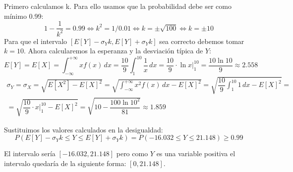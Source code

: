 Primero calculamos k. Para ello usamos que la probabilidad debe ser como mínimo 0.99:
\begin{equation*}
    1-\dfrac{1}{k^2} = 0.99 \iff k^2 = 1/0.01 \iff k = \pm \sqrt{100} \iff k = \pm 10
\end{equation*}
Para que el intervalo $[E[Y] - \sigma_Y k, E[Y] + \sigma_Y k]$ sea correcto debemos tomar $k=10$. Ahora calcularemos la esperanza y la desviación típica de $Y$:
\begin{equation*}
    E[Y] = E[X] = \int_{-\infty}^{+\infty} xf(x) \,dx  = \dfrac{10}{9} \int_{1}^{10} \dfrac{1}{x} \,dx = \dfrac{10}{9} \cdot \ln x \Big|_1^{10} = \dfrac{10 \ln{10}}{9} \approx 2.558
\end{equation*}
\begin{gather*}
    \sigma_Y = \sigma_X = \sqrt{E[X^2]-E[X]^2} = \sqrt{\int_{-\infty}^{+\infty} x^2f(x) \,dx - E[X]^2} =\sqrt{ \dfrac{10}{9} \int_{1}^{10} 1 \,dx - E[X]^2}=\\
    =\sqrt{\dfrac{10}{9} \cdot x \Big|_1^{10}- E[X]^2} =\sqrt{10- \dfrac{100 \ln{10}^2}{81}} \approx 1.859
\end{gather*}

Sustituimos los valores calculados en la desigualdad:
\begin{equation*}
    P(E[Y] - \sigma_Y k \leq Y \leq E[Y] + \sigma_Y k) = P(-16.032 \leq Y \leq 21.148 )\geq 0.99
\end{equation*}

El intervalo sería $[-16.032,21.148]$ pero como $Y$ es una variable positiva el intervalo quedaría de la siguiente forma: $[0,21.148]$.
